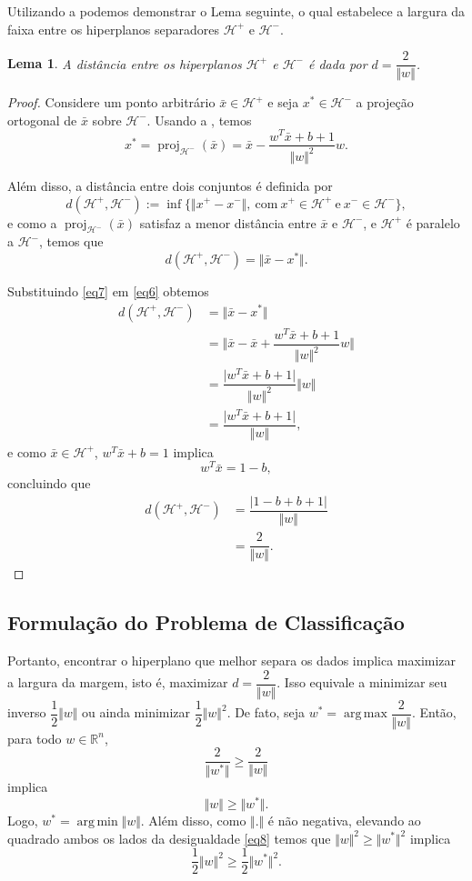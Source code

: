 \documentclass[12pt,a4paper]{scrartcl}
\DeclareMathOperator{\proj}{proj}
\DeclareMathOperator*{\argmax}{arg\, max}
\DeclareMathOperator*{\argmin}{arg\, min}
\def\Hset{\mathcal{H}}
\def\RR{\mathds{R}}
\def\xbar{\bar{x}}
\newtheorem{lema}{Lema}
\theoremstyle{definition}%
\begin{document}
Utilizando a  podemos demonstrar o Lema seguinte, o qual estabelece a largura da faixa entre os hiperplanos separadores $\Hset^{+}$ e $\Hset^{-}$.

\begin{lema} A distância entre os hiperplanos $\Hset^{+}$ e $\Hset^{-}$ é dada por $d=\dfrac{2}{\Vert w\Vert}$. 
\end{lema}
\begin{proof}
Considere um ponto arbitrário $\xbar\in \Hset^{+}$ e seja $x^{*}\in \Hset^{-}$ a projeção ortogonal de $\xbar$ sobre $\Hset^{-}$. Usando a , temos
\[ \label{eq6} x^{*}= \proj_{\Hset^{-}}(\xbar)= \xbar - \dfrac{w^{T}\xbar+b+1}{\Vert w\Vert^{2}}w. \] 

Além disso, a distância entre dois conjuntos é definida por
\[ d(\Hset^{+}, \Hset^{-}):= \inf\{\Vert x^{+}-x^{-} \Vert , \ \text{com} \ x^{+}\in \Hset^{+} \ \text{e} \ x^{-}\in \Hset^{-}\},
\]
e como a $\proj_{\Hset^{-}}(\xbar)$ satisfaz a menor distância entre $\xbar$ e $\Hset^{-}$, e $\Hset^{+}$ é paralelo a $\Hset^{-}$, temos que 
\[ \label{eq7} d(\Hset^{+},\Hset^{-})=\Vert \xbar-x^{*}\Vert. \]

Substituindo \eqref{eq7} em \eqref{eq6} obtemos
\begin{align} 
d(\Hset^{+},\Hset^{-}) &= \Vert \xbar-x^{*}\Vert \\
&= \Vert \xbar -\xbar +\dfrac{w^{T}\xbar+b+1}{\Vert w\Vert^{2}}w \Vert \\
&=  \dfrac{\vert w^{T}\xbar+b+1 \vert}{\Vert w\Vert^{2}} \Vert w\Vert \\
&= \dfrac{\vert w^{T}\xbar+b+1 \vert}{\Vert w\Vert},
\end{align}
e como $\xbar\in \Hset^{+}$,  $ w^{T}\xbar+b=1$ implica
\[  w^{T}\xbar =1-b, \]
concluindo que 
\begin{align} 
d(\Hset^{+},\Hset^{-})&= \dfrac{\vert 1-b+b+1 \vert}{\Vert w\Vert} \\
&= \dfrac{2}{\Vert w\Vert }. 
\end{align}
\end{proof}

\subsection{Formulação do Problema de Classificação}

Portanto, encontrar o hiperplano que melhor separa os dados implica maximizar a largura da margem, isto é, maximizar $d=\dfrac{2}{\Vert w\Vert }$. Isso equivale a minimizar seu inverso $\dfrac{1}{2}\Vert w\Vert $ ou ainda minimizar $\dfrac{1}{2}\Vert w\Vert^{2}$. De fato, seja $w^{*}=\argmax\dfrac{2}{\Vert w\Vert}$. Então, para todo $w\in \RR^n$,
\[ \dfrac{2}{\Vert w^{*}\Vert} \geq \dfrac{2}{\Vert w\Vert} \]
implica
\[ \label{eq8} \Vert w\Vert \geq \Vert w^{*}\Vert. \]
Logo, $w^{*}=\argmin\Vert w\Vert$. Além disso, como $\Vert .\Vert$ é não negativa, elevando ao quadrado ambos os lados da desigualdade \eqref{eq8} temos que  $\Vert w\Vert^{2} \geq \Vert w^{*}\Vert^{2}$ implica
\[ \dfrac{1}{2}\Vert w\Vert^{2} \geq \dfrac{1}{2}\Vert w^{*}\Vert^{2}. \]
\end{document}
